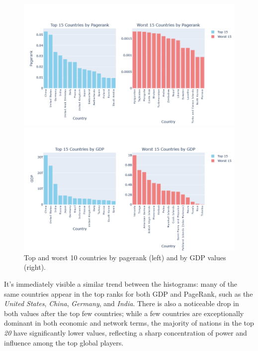 \documentclass[12pt, a4paper]{article}
\begin{document}
\begin{figure}[!ht]
\centering
\begin{minipage}[b]{0.49\textwidth}
    \centering
    \includegraphics[width=\textwidth]{figures/question3/figure_7a.png}
\end{minipage}
\hfill
\begin{minipage}[b]{0.49\textwidth}
    \centering
    \includegraphics[width=\textwidth]{figures/question3/figure_7b.png}
\end{minipage}
\captionsetup{font=scriptsize,labelfont=bf}
\caption{Top and worst 10 countries by pagerank (left) and by GDP values (right).}
\label{fig:figure7}
\end{figure}

It's immediately visible a similar trend between the histograms: many of the same countries appear in the top ranks for both GDP and PageRank, such as the \textit{United States}, \textit{China}, \textit{Germany}, and \textit{India}. There is also a noticeable drop in both values after the top few countries; while a few countries are exceptionally dominant in both economic and network terms, the majority of nations in the top \textit{20} have significantly lower values, reflecting a sharp concentration of power and influence among the top global players.\\
\end{document}
